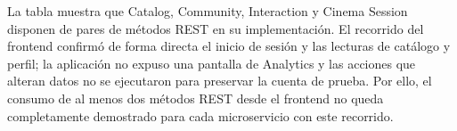 La tabla muestra que Catalog, Community, Interaction y Cinema Session disponen de pares de métodos REST en su implementación. El recorrido del frontend confirmó de forma directa el inicio de sesión y las lecturas de catálogo y perfil; la aplicación no expuso una pantalla de Analytics y las acciones que alteran datos no se ejecutaron para preservar la cuenta de prueba. Por ello, el consumo de al menos dos métodos REST desde el frontend no queda completamente demostrado para cada microservicio con este recorrido.
